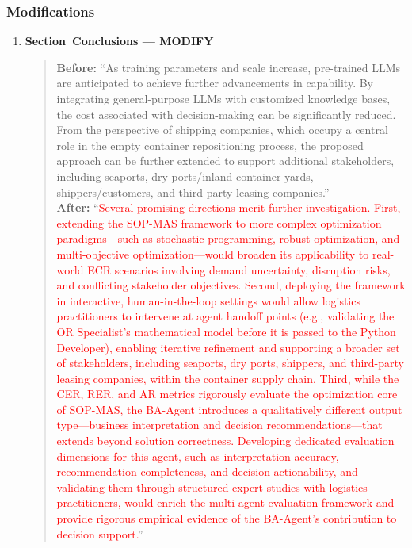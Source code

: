 \documentclass[11pt,a4paper]{article}
\begin{document}
\subsubsection{Modifications}

\begin{enumerate}
\item \textbf{Section~Conclusions --- MODIFY}
\begin{quote}
\textbf{Before:} ``As training parameters and scale increase, pre-trained LLMs are anticipated to achieve further advancements in capability. By integrating general-purpose LLMs with customized knowledge bases, the cost associated with decision-making can be significantly reduced. From the perspective of shipping companies, which occupy a central role in the empty container repositioning process, the proposed approach can be further extended to support additional stakeholders, including seaports, dry ports/inland container yards, shippers/customers, and third-party leasing companies.''\\[4pt]
\textbf{After:} ``\textcolor{red}{Several promising directions merit further investigation. First, extending the SOP-MAS framework to more complex optimization paradigms---such as stochastic programming, robust optimization, and multi-objective optimization---would broaden its applicability to real-world ECR scenarios involving demand uncertainty, disruption risks, and conflicting stakeholder objectives. Second, deploying the framework in interactive, human-in-the-loop settings would allow logistics practitioners to intervene at agent handoff points (e.g., validating the OR Specialist's mathematical model before it is passed to the Python Developer), enabling iterative refinement and supporting a broader set of stakeholders, including seaports, dry ports, shippers, and third-party leasing companies, within the container supply chain. Third, while the CER, RER, and AR metrics rigorously evaluate the optimization core of SOP-MAS, the BA-Agent introduces a qualitatively different output type---business interpretation and decision recommendations---that extends beyond solution correctness. Developing dedicated evaluation dimensions for this agent, such as interpretation accuracy, recommendation completeness, and decision actionability, and validating them through structured expert studies with logistics practitioners, would enrich the multi-agent evaluation framework and provide rigorous empirical evidence of the BA-Agent's contribution to decision support.}''
\end{quote}
\end{enumerate}
\end{document}
